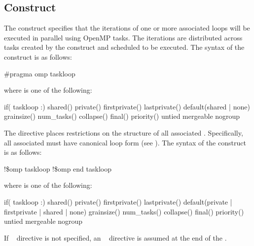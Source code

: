 \subsection{ Construct}
\label{subsec:taskloop Construct}
\summary
The  construct specifies that the iterations of one or more associated loops will be executed in parallel using OpenMP tasks. The iterations are distributed across tasks created by the construct and scheduled to be executed.
\syntax
\ccppspecificstart
The syntax of the  construct is as follows:
\begin{boxedcode}
\#pragma omp taskloop 
\end{boxedcode}
where  is one of the following:
\begin{indentedcodelist}
if(\plc{[} taskloop :\plc{] scalar-expr})
shared()
private()
firstprivate()
lastprivate()
default(shared \textnormal{|} none)
grainsize()
num_tasks()
collapse()
final()
priority()
untied
mergeable
nogroup
\end{indentedcodelist}

The  directive places restrictions on the structure of all associated . Specifically, all associated  must have canonical loop form (see ).
\ccppspecificend
\fortranspecificstart
The syntax of the  construct is as follows:
\begin{boxedcode}
!\$omp taskloop 
\plc{[}!\$omp end taskloop\plc{]}
\end{boxedcode}
where  is one of the following:
\begin{indentedcodelist}
if(\plc{[} taskloop :\plc{] scalar-logical-expr})
shared()
private()
firstprivate()
lastprivate()
default(private \textnormal{|} firstprivate \textnormal{|} shared \textnormal{|} none)
grainsize()
num_tasks()
collapse()
final()
priority()
untied
mergeable
nogroup
\end{indentedcodelist}

If ~ directive is not specified, an ~ directive is assumed at the end of the .

